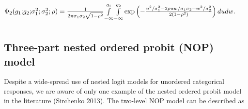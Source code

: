 \documentclass[letterpaper,fleqn,12pt]{article}
\begin{document}
\begin{center}
$\Phi _{2}(g_{1}\mathbf{;}g_{2}\mathbf{;}\sigma _{1}^{2};\sigma
_{2}^{2};\rho )=\frac{1}{2\pi \sigma _{1}\sigma _{2}\sqrt{1-\rho ^{2}}}%
\underset{}{\underset{-\infty }{\overset{g_{1}}{\int }}}\underset{-\infty }{%
\overset{g_{2}}{\int }}\exp \left( -\frac{u^{2}/\sigma _{1}^{2}-2\rho
uw/\sigma _{1}\sigma _{2}+w^{2}/\sigma _{2}^{2}}{2(1-\rho ^{2})}\right)
dudw. $
\end{center}

\subsection{Three-part nested ordered probit (NOP) model}

Despite a wide-spread use of nested logit models for unordered categorical
responses, we are aware of only one example of the nested ordered probit
model in the literature (Sirchenko 2013). The two-level NOP model can be
described as

\bigskip
\end{document}
